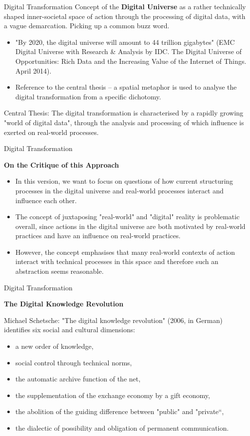 \documentclass{beamer}
\newcommand{\ueberschrift}[1]{\begin{center}\bf #1\end{center}}
\begin{document}
\begin{frame}{Digital Transformation}
  Concept of the \textbf{Digital Universe} as a rather technically shaped
  inner-societal space of action through the processing of digital data, with
  a vague demarcation.  Picking up a common buzz word.
\begin{itemize}
\item "By 2020, the digital universe will amount to 44 trillion gigabytes"
  (EMC Digital Universe with Research \& Analysis by IDC. The Digital Universe
  of Opportunities: Rich Data and the Increasing Value of the Internet of
  Things. April 2014).
\item Reference to the central thesis -- a spatial metaphor is used to analyse
  the digital transformation from a specific dichotomy.
\end{itemize}
\begin{block}{Central Thesis:}
  The digital transformation is characterised by a rapidly growing "world of
  digital data", through the analysis and processing of which influence is
  exerted on real-world processes.
\end{block}
\end{frame}
\begin{frame}{Digital Transformation}
  \ueberschrift{On the Critique of this Approach}
  \begin{itemize}
  \item In this version, we want to focus on questions of how current
    structuring processes in the digital universe and real-world processes
    interact and influence each other.
  \item The concept of juxtaposing "real-world" and "digital" reality is
    problematic overall, since actions in the digital universe are both
    motivated by real-world practices and have an influence on real-world
    practices.
 \item However, the concept emphasises that many real-world contexts of action
   interact with technical processes in this space and therefore such an
   abstraction seems reasonable.
  \end{itemize}
\end{frame}
\begin{frame}{Digital Transformation}
  \ueberschrift{The Digital Knowledge Revolution}

Michael Schetsche: "The digital knowledge revolution" (2006, in German)
identifies six social and cultural dimensions:
\begin{itemize}
\item a new order of knowledge,
\item social control through technical norms,
\item the automatic archive function of the net,
\item the supplementation of the exchange economy by a gift economy,
\item the abolition of the guiding difference between "public" and "private“, 
\item the dialectic of possibility and obligation of permanent communication.
\end{itemize}
\end{frame}
\end{document}
